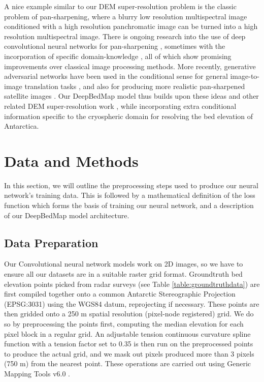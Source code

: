\documentclass[tc, manuscript]{copernicus}
\begin{document}
A nice example similar to our DEM super-resolution problem is the classic problem of pan-sharpening, where a blurry low resolution multispectral image conditioned with a high resolution panchromatic image can be turned into a high resolution multispectral image.
There is ongoing research into the use of deep convolutional neural networks for pan-sharpening \citep{MasiPansharpeningConvolutionalNeural2016,ScarpaTargetAdaptiveCNNBasedPansharpening2018}, sometimes with the incorporation of specific domain-knowledge \citep{YangPanNetDeepNetwork2017}, all of which show promising improvements over classical image processing methods.
More recently, generative adversarial networks \citep{GoodfellowGenerativeAdversarialNetworks2014} have been used in the conditional sense for general image-to-image translation tasks \citep[e.g.][]{IsolaImagetoImageTranslationConditional2016,ParkSemanticImageSynthesis2019}, and also for producing more realistic pan-sharpened satellite images \citep{LiuPSGANGenerativeAdversarial2018}.
Our DeepBedMap model thus builds upon these ideas and other related DEM super-resolution work \citep{XuNonlocalsimilaritybased2015,ChenConvolutionalNeuralNetwork2016}, while incorporating extra conditional information specific to the cryospheric domain for resolving the bed elevation of Antarctica.


\section{Data and Methods}

In this section, we will outline the preprocessing steps used to produce our neural network's training data.
This is followed by a mathematical definition of the loss function which forms the basis of training our neural network, and a description of our DeepBedMap model architecture.

\subsection{Data Preparation}

Our Convolutional neural network models work on 2D images, so we have to ensure all our datasets are in a suitable raster grid format.
Groundtruth bed elevation points picked from radar surveys (see Table \ref{table:groundtruthdata}) are first compiled together onto a common Antarctic Stereographic Projection (EPSG:3031) using the WGS84 datum, reprojecting if necessary.
These points are then gridded onto a 250 m spatial resolution (pixel-node registered) grid.
We do so by preprocessing the points first, computing the median elevation for each pixel block in a regular grid.
An adjustable tension continuous curvature spline function with a tension factor set to 0.35 is then run on the preprocessed points to produce the actual grid, and we mask out pixels produced more than 3 pixels (750 m) from the nearest point.
These operations are carried out using Generic Mapping Tools v6.0 \citep[GMT6,][]{WesselGenericMappingTools2019}.
\end{document}
